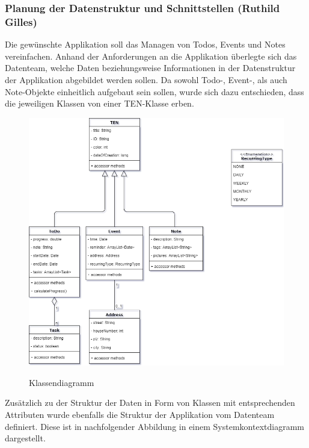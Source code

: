 \newpage
\subsubsection{Planung der Datenstruktur und Schnittstellen (Ruthild Gilles)}

Die gewünschte Applikation soll das Managen von Todos, Events und Notes vereinfachen. Anhand der Anforderungen an die Applikation überlegte sich das Datenteam, welche Daten beziehungsweise Informationen in der Datenstruktur der Applikation abgebildet werden sollen. Da sowohl Todo-, Event-, als auch Note-Objekte einheitlich aufgebaut sein sollen, wurde sich dazu entschieden, dass die jeweiligen Klassen von einer TEN-Klasse erben.

\begin{figure}[H]
\centering
\begin{minipage}[t]{1\textwidth} %
\caption{Klassendiagramm} %
\includegraphics[width=1\textwidth]{img/Klassendiagramm}\\ %
\end{minipage}
\end{figure}

Zusätzlich zu der Struktur der Daten in Form von Klassen mit entsprechenden Attributen wurde ebenfalls die Struktur der Applikation vom Datenteam definiert. Diese ist in nachfolgender Abbildung in einem Systemkontextdiagramm dargestellt.

